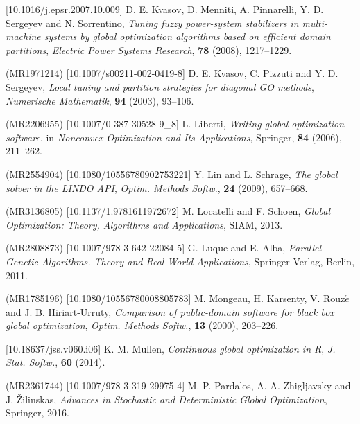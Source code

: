 \documentclass{naco}
\theoremstyle{definition}
\begin{document}
\begin{thebibliography}{99}
 [10.1016/j.epsr.2007.10.009]
\newblock D. E. Kvasov, D. Menniti, A. Pinnarelli, Y. D. Sergeyev and N. Sorrentino,
\newblock \emph{\emph{Tuning fuzzy power-system stabilizers in multi-machine systems by global optimization algorithms based on
 efficient domain partitions}},
\newblock \emph{Electric Power Systems Research}, \textbf{78} (2008), 1217--1229.

 (MR1971214) [10.1007/s00211-002-0419-8]
\newblock D. E. Kvasov, C. Pizzuti and Y. D. Sergeyev,
\newblock \emph{\emph{Local tuning and partition strategies for diagonal GO methods}},
\newblock \emph{Numerische Mathematik}, \textbf{94} (2003), 93--106.

 (MR2206955) [10.1007/0-387-30528-9_8]
\newblock L. Liberti,
\newblock \emph{\emph{Writing global optimization software}},
\newblock in \emph{Nonconvex Optimization and Its Applications}, Springer, \textbf{84} (2006), 211--262.


 (MR2554904) [10.1080/10556780902753221]
\newblock Y. Lin and L. Schrage,
\newblock \emph{\emph{The global solver in the LINDO API}},
\newblock \emph{Optim. Methods Softw.}, \textbf{24} (2009), 657--668.

 (MR3136805) [10.1137/1.9781611972672]
\newblock M. Locatelli and F. Schoen,
\newblock \emph{Global Optimization: Theory, Algorithms and Applications},
\newblock SIAM, 2013.

 (MR2808873) [10.1007/978-3-642-22084-5]
\newblock G. Luque and E. Alba,
\newblock \emph{Parallel Genetic Algorithms. Theory and Real World Applications},
\newblock Springer-Verlag, Berlin, 2011.

 (MR1785196) [10.1080/10556780008805783]
\newblock M. Mongeau, H. Karsenty, V. Rouz$\acute{e}$ and J. B. Hiriart-Urruty,
\newblock \emph{\emph{Comparison of public-domain software for black box global optimization}},
\newblock \emph{Optim. Methods Softw.}, \textbf{13} (2000), 203--226.

 [10.18637/jss.v060.i06]
\newblock K. M. Mullen,
\newblock \emph{\emph{Continuous global optimization in R}},
\newblock \emph{J. Stat. Softw.}, \textbf{60} (2014).

 (MR2361744) [10.1007/978-3-319-29975-4]
\newblock M. P. Pardalos, A. A. Zhigljavsky and J. \v Zilinskas,
\newblock \emph{Advances in Stochastic and Deterministic Global Optimization},
\newblock Springer, 2016.


\end{thebibliography}
\end{document}
